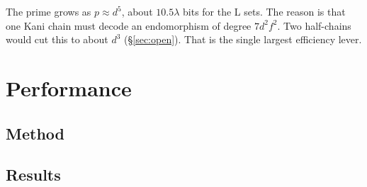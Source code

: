 \documentclass[11pt,a4paper]{article}
\newcommand{\F}{\mathbb{F}}
\begin{document}
\begin{table}[h]
\centering
\caption{Parameters and object sizes in bytes. Public key and ciphertext are
four $\F_{p^2}$ elements each. Files add an 8-byte header. A PKE ciphertext
is the KEM ciphertext, a 12-byte nonce, the message and a 16-byte tag.
Sizes measured by the benchmark (\texttt{sizes} rows); parameters from
\texttt{eigenx:src/params\_generated.rs}.}
\label{tab:params}
\end{table}

The prime grows as $p\approx d^5$, about $10.5\lambda$ bits for the L sets.
The reason is that one Kani chain must decode an endomorphism of degree
$7d^2f^2$. Two half-chains would cut this to about $d^3$
(\S\ref{sec:open}). That is the single largest efficiency lever.

\section{Performance}\label{sec:perf}

\subsection{Method}\label{sec:method}
\MethodText

\subsection{Results}

\begin{table}[h]
\centering
\caption{Wall time in seconds, median [min--max] over $n$ samples, all
four vCPUs available (the KEM uses scoped threads inside decapsulation and
encapsulation). Key generation is one attempt loop per key
(\texttt{jobs}=1 for L, \texttt{jobs}=4 for Q). Every decapsulation and PKE
decryption returned the right value. Run \texttt{\BenchRunId}.}
\label{tab:perf}
\end{table}
\end{document}
